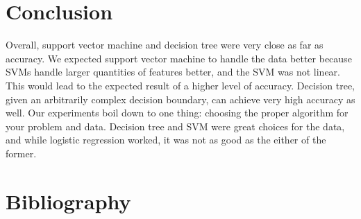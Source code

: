 \documentclass{article} %
\begin{document}
\section{Conclusion}
Overall, support vector machine and decision tree were very close as far as accuracy.
We expected support vector machine to handle the data better because SVMs handle
larger quantities of features better, and the SVM was not linear. This would lead
to the expected result of a higher level of accuracy. Decision tree, given an
arbitrarily complex decision boundary, can achieve very high accuracy as well. Our
experiments boil down to one thing: choosing the proper algorithm for your
problem and data. Decision tree and SVM were great choices for the data, and while
logistic regression worked, it was not as good as the either of the former.

\clearpage

\section{Bibliography}


\end{document}
